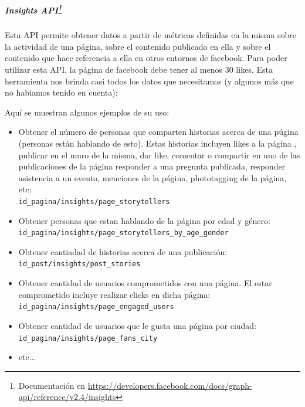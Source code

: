 \documentclass[oneside]{book}
\begin{document}
	

	\subparagraph*{Insights API\footnote{Documentaci\'{o}n en \url{https://developers.facebook.com/docs/graph-api/reference/v2.4/insights}}}

	Esta API permite obtener datos a partir de m\'{e}tricas definidas en la misma sobre la actividad de una p\'{a}gina, sobre el contenido publicado en ella y sobre el contenido que hace referencia a ella en otros entornos de facebook.
	Para poder utilizar esta API, la p\'{a}gina de facebook debe tener al menos 30 likes.
	Esta herramienta nos brinda casi todos los datos que necesitamos (y algunos m\'{a}s que no habiamos tenido en cuenta):
	
	Aqu\'{i} se muestran algunos ejemplos de su uso:\\

	\begin{itemize}
  		\item Obtener el n\'{u}mero de personas que comparten historias acerca de una p\'{u}gina (personas están hablando de esto). Estas historias incluyen likes a la p\'{a}gina , publicar en el muro de la misma, dar like, comentar o compartir en uno de las publicaciones de la p\'{a}gina\; responder a una pregunta publicada, responder asistencia a un evento, menciones de la p\'{a}gina, phototagging de la p\'{a}gina, etc:\\ 
  		\texttt{id\_pagina/insights/page\_storytellers}

  		\item Obtener personas que estan hablando de la p\'{a}gina por edad y g\'{e}nero:\\
  		\texttt{id\_pagina/insights/page\_storytellers\_by\_age\_gender}

  		\item Obtener cantiadad de historias acerca de una publicaci\'{o}n:\\
  		\texttt{id\_post/insights/post\_stories}

  		\item Obtener cantidad de usuarios comprometidos con una p\'{a}gina. El estar comprometido incluye realizar clicks en dicha p\'{a}gina:\\
  		\texttt{id\_pagina/insights/page\_engaged\_users}

  		\item Obtener cantidad de usuarios que le gusta una p\'{a}gina por ciudad:\\
  		\texttt{id\_pagina/insights/page\_fans\_city}

  		\item etc...
	\end{itemize}
	
\end{document}
